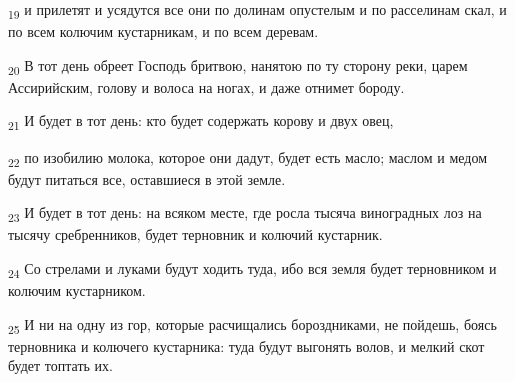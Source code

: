 \begin{tcolorbox}
\textsubscript{19} и прилетят и усядутся все они по долинам опустелым и по расселинам скал, и по всем колючим кустарникам, и по всем деревам.
\end{tcolorbox}
\begin{tcolorbox}
\textsubscript{20} В тот день обреет Господь бритвою, нанятою по ту сторону реки, царем Ассирийским, голову и волоса на ногах, и даже отнимет бороду.
\end{tcolorbox}
\begin{tcolorbox}
\textsubscript{21} И будет в тот день: кто будет содержать корову и двух овец,
\end{tcolorbox}
\begin{tcolorbox}
\textsubscript{22} по изобилию молока, которое они дадут, будет есть масло; маслом и медом будут питаться все, оставшиеся в этой земле.
\end{tcolorbox}
\begin{tcolorbox}
\textsubscript{23} И будет в тот день: на всяком месте, где росла тысяча виноградных лоз на тысячу сребренников, будет терновник и колючий кустарник.
\end{tcolorbox}
\begin{tcolorbox}
\textsubscript{24} Со стрелами и луками будут ходить туда, ибо вся земля будет терновником и колючим кустарником.
\end{tcolorbox}
\begin{tcolorbox}
\textsubscript{25} И ни на одну из гор, которые расчищались бороздниками, не пойдешь, боясь терновника и колючего кустарника: туда будут выгонять волов, и мелкий скот будет топтать их.
\end{tcolorbox}

